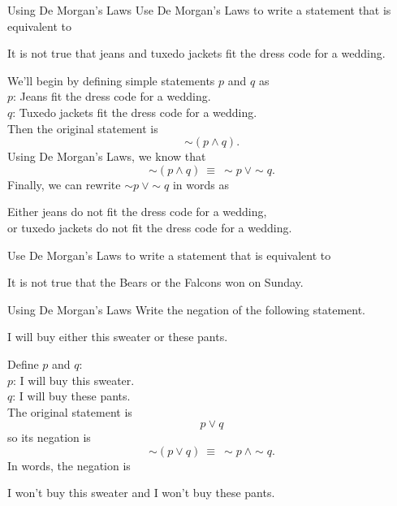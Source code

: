 \begin{example}[https://www.youtube.com/watch?v=98MouQeY1BQ]{Using De Morgan's Laws}
Use De Morgan's Laws to write a statement that is equivalent to
\begin{center}
It is not true that jeans and tuxedo jackets fit the dress code for a wedding.
\end{center}

\sol
We'll begin by defining simple statements $p$ and $q$ as\\
$p$: Jeans fit the dress code for a wedding.\\
$q$: Tuxedo jackets fit the dress code for a wedding.\\

Then the original statement is \[\sim (p \wedge q).\]
Using De Morgan's Laws, we know that \[\sim (p \wedge q)\ \equiv\ \sim p\ \vee \sim q.\]
Finally, we can rewrite $\sim p\ \vee \sim q$ in words as
\begin{center}
Either jeans do not fit the dress code for a wedding,\\ or tuxedo jackets do not fit the dress code for a wedding.
\end{center}
\end{example}

\begin{try}
Use De Morgan's Laws to write a statement that is equivalent to 
\begin{center}
It is not true that the Bears or the Falcons won on Sunday.
\end{center}
\end{try}

\begin{example}[https://www.youtube.com/watch?v=3ldKuAfCEfw]{Using De Morgan's Laws}
Write the negation of the following statement.
\begin{center}
I will buy either this sweater or these pants.
\end{center}

\sol
Define $p$ and $q$:\\
$p$: I will buy this sweater.\\
$q$: I will buy these pants.\\

The original statement is \[p \vee q\] so its negation is 
\[\sim (p \vee q)\ \equiv\ \sim p\ \wedge \sim q.\]
In words, the negation is
\begin{center}
I won't buy this sweater and I won't buy these pants.
\end{center}
\end{example}

